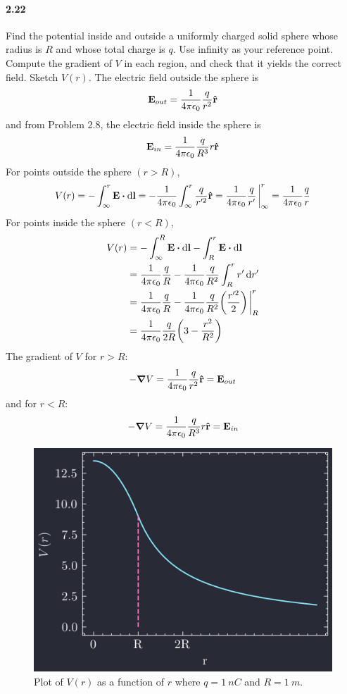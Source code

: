 \documentclass[../main.tex]{subfiles}
\begin{document}
\pagestyle{fancy}

\setcounter{section}{2}
\paragraph{2.22} \label{prob:2_21}
Find the potential inside and outside a uniformly charged solid sphere whose radius is $R$ and whose
total charge is $q$. Use infinity as your reference point. Compute the gradient of $V$ in each
region, and check that it yields the correct field. Sketch $V(r)$.
\barh
The electric field outside the sphere is
\[ \vb{E}_{out} = \frac{1}{4\pi\epsilon_0} \frac{q}{r^2} \vu{r} \]
and from Problem 2.8, the electric field inside the sphere is
\[ \vb{E}_{in} = \frac{1}{4\pi\epsilon_0} \frac{q}{R^3} r \vu{r} \]
For points outside the sphere $(r > R)$,
\[
    V(r) = - \int_\infty^r \vb{E} \vdot \dd{\vb{l}} = - \ke \int_\infty^r \frac{q}{r'^2} \vu{r}
    = \ke \frac{q}{r'} \eval_\infty^r = \ke \frac{q}{r}
\]
For points inside the sphere $(r < R)$,
\begin{align*}
    V(r) &= - \int_\infty^R \vb{E} \vdot \dd{\vb{l}} - \int_R^r \vb{E} \vdot \dd{\vb{l}} \\
    &= \ke \frac{q}{R} - \ke \frac{q}{R^2} \int_R^r r' \dd{r'} \\
    &= \ke \frac{q}{R} - \ke \frac{q}{R^2} \qt(\frac{r'^2}{2}) \eval_R^r \\
    &= \ke \frac{q}{2R} \qt(3 - \frac{r^2}{R^2}) 
\end{align*}
The gradient of $V$ for $r > R$:
\[ -\grad V = \frac{1}{4\pi\epsilon_0} \frac{q}{r^2} \vu{r} = \vb{E}_{out} \]
and for $r < R$:
\[ -\grad V = \frac{1}{4\pi\epsilon_0} \frac{q}{R^3} r \vu{r} = \vb{E}_{in} \]
\begin{figure}[ht]
    \centering
    \includegraphics[width=0.5\linewidth]{images/fig2_21.png}
    \captionsetup{width=0.8\linewidth}
    \caption{Plot of $V(r)$ as a function of $r$ where $q = \qty{1}{nC}$ and $R = \qty{1}{m}$.}
    \label{fig:2_21}
\end{figure}
\end{document}
